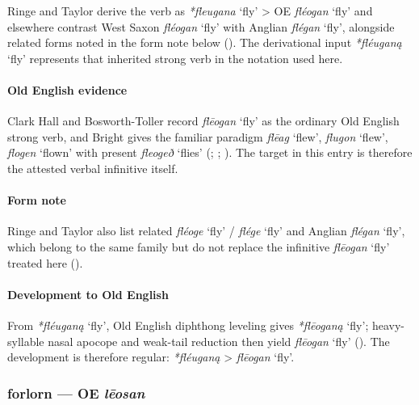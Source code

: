 \documentclass[
  british,
  a4paper,
]{article}
\providecommand{\Recon}[1]{\emph{*#1}}
\begin{document}
Ringe and Taylor derive the verb as \emph{*fleugana} `fly'
\textgreater{} OE \emph{fléogan} `fly' and elsewhere contrast West Saxon
\emph{fléogan} `fly' with Anglian \emph{flégan} `fly', alongside related
forms noted in the form note below (). The derivational input \Recon{fléuganą} `fly'
represents that inherited strong verb in the notation used here.

\paragraph{Old English evidence}\label{old-english-evidence-24}

Clark Hall and Bosworth-Toller record \emph{flēogan} `fly' as the
ordinary Old English strong verb, and Bright gives the familiar paradigm
\emph{flēag} `flew', \emph{flugon} `flew', \emph{flogen} `flown' with
present \emph{fleogeð} `flies' (; ;
). The target in
this entry is therefore the attested verbal infinitive itself.

\paragraph{Form note}\label{form-note-1}

Ringe and Taylor also list related \emph{fléoge} `fly' / \emph{flége}
`fly' and Anglian \emph{flégan} `fly', which belong to the same family
but do not replace the infinitive \emph{flēogan} `fly' treated here
().

\paragraph{Development to Old
English}\label{development-to-old-english-24}

From \Recon{fléuganą} `fly', Old English diphthong leveling gives
\Recon{flēoganą} `fly'; heavy-syllable nasal apocope and weak-tail
reduction then yield \emph{flēogan} `fly'
(). The development
is therefore regular: \emph{*fléuganą} \textgreater{} \emph{flēogan}
`fly'.

\subsubsection{\texorpdfstring{forlorn --- OE
\emph{lēosan}}{forlorn --- OE lēosan}}\label{forlorn-oe-lux113osan}
\end{document}
